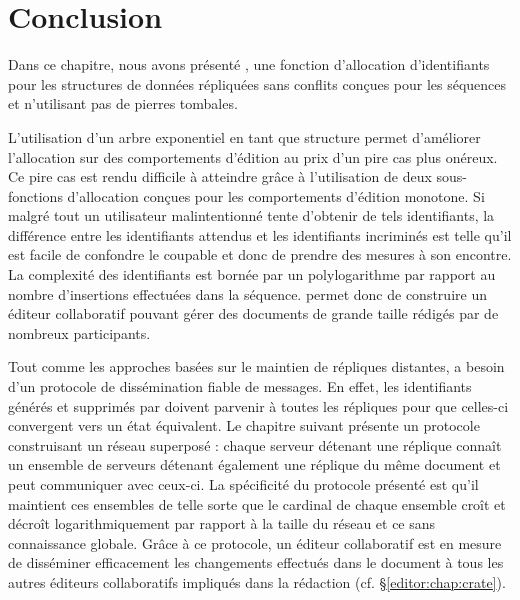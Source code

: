 
\section{Conclusion}
\label{repl:sec:conclusion}

Dans ce chapitre, nous avons présenté \LSEQ, une fonction d'allocation
d'identifiants pour les structures de données répliquées sans conflits conçues
pour les séquences et n'utilisant pas de pierres tombales.

L'utilisation d'un arbre exponentiel en tant que structure permet d'améliorer
l'allocation sur des comportements d'édition au prix d'un pire cas plus
onéreux. Ce pire cas est rendu difficile à atteindre grâce à l'utilisation de
deux sous-fonctions d'allocation conçues pour les comportements d'édition
monotone. Si malgré tout un utilisateur malintentionné tente d'obtenir de tels
identifiants, la différence entre les identifiants attendus et les identifiants
incriminés est telle qu'il est facile de confondre le coupable et donc de
prendre des mesures à son encontre. La complexité des identifiants \LSEQ est
bornée par un polylogarithme par rapport au nombre d'insertions effectuées
dans la séquence. \LSEQ permet donc de construire un éditeur collaboratif pouvant
gérer des documents de grande taille rédigés par de nombreux participants.

Tout comme les approches basées sur le maintien de répliques distantes, \LSEQ a
besoin d'un protocole de dissémination fiable de messages. En effet, les
identifiants générés et supprimés par \LSEQ doivent parvenir à toutes les
répliques pour que celles-ci convergent vers un état équivalent.  Le chapitre
suivant présente un protocole construisant un réseau superposé : chaque serveur
détenant une réplique connaît un ensemble de serveurs détenant également une
réplique du même document et peut communiquer avec ceux-ci. La spécificité du
protocole présenté est qu'il maintient ces ensembles de telle sorte que le
cardinal de chaque ensemble croît et décroît logarithmiquement par rapport à la
taille du réseau et ce sans connaissance globale. Grâce à ce protocole, un
éditeur collaboratif est en mesure de disséminer efficacement les changements
effectués dans le document à tous les autres éditeurs collaboratifs impliqués
dans la rédaction (cf. §\ref{editor:chap:crate}).

